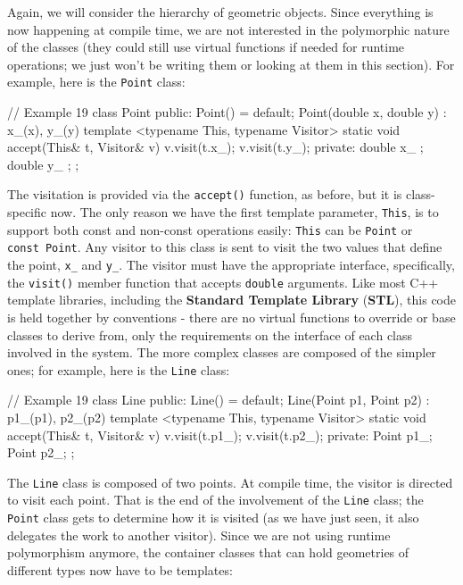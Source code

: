Again, we will consider the hierarchy of geometric objects. Since everything is now happening at compile time, we are not interested in the polymorphic nature of the classes (they could still use virtual functions if needed for runtime operations; we just won't be writing them or looking at them in this section). For example, here is the \texttt{Point} class:

\begin{code}
// Example 19
class Point {
  public:
  Point() = default;
  Point(double x, double y) : x_(x), y_(y) {}
  template <typename This, typename Visitor>
  static void accept(This& t, Visitor& v) {
    v.visit(t.x_);
    v.visit(t.y_);
  }
  private:
  double x_ {};
  double y_ {};
};
\end{code}

The visitation is provided via the \texttt{accept()} function, as before, but it is class-specific now. The only reason we have the first template parameter, \texttt{This}, is to support both const and non-const operations easily: \texttt{This} can be \texttt{Point} or \texttt{const\ Point}. Any visitor to this class is sent to visit the two values that define the point, \texttt{x\_} and \texttt{y\_}. The visitor must have the appropriate interface, specifically, the \texttt{visit()} member function that accepts \texttt{double} arguments. Like most C++ template libraries, including the \textbf{Standard Template Library} (\textbf{STL}), this code is held together by conventions - there are no virtual functions to override or base classes to derive from, only the requirements on the interface of each class involved in the system. The more complex classes are composed of the simpler ones; for example, here is the \texttt{Line} class:

\begin{code}
// Example 19
class Line {
  public:
  Line() = default;
  Line(Point p1, Point p2) : p1_(p1), p2_(p2) {}
  template <typename This, typename Visitor>
  static void accept(This& t, Visitor& v) {
    v.visit(t.p1_);
    v.visit(t.p2_);
  }
  private:
  Point p1_;
  Point p2_;
};
\end{code}

The \texttt{Line} class is composed of two points. At compile time, the visitor is directed to visit each point. That is the end of the involvement of the \texttt{Line} class; the \texttt{Point} class gets to determine how it is visited (as we have just seen, it also delegates the work to another visitor). Since we are not using runtime polymorphism anymore, the container classes that can hold geometries of different types now have to be templates:

